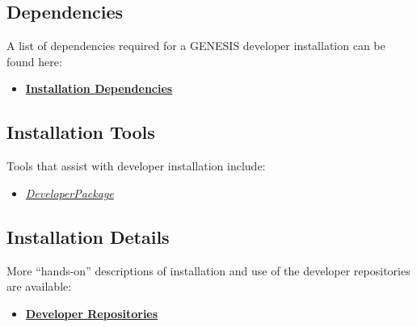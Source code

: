 \documentclass[12pt]{article}
\begin{document}
\subsection*{Dependencies}
A list of dependencies required for a GENESIS developer installation can be found here:
\begin{itemize}
   \item[]\href{../genesis-dependencies/genesis-dependencies.tex}{\bf Installation Dependencies}
\end{itemize}

\subsection*{Installation Tools}
Tools that assist with developer installation include:
\begin{itemize}
   \item[]\href{../developer-package/developer-package.tex}{\it DeveloperPackage}
\end{itemize}

\subsection*{Installation Details}
More ``hands-on'' descriptions of installation and use of the developer repositories are available:
\begin{itemize}
   \item[]\href{../developer-repository/developer-repository.tex}{\bf Developer Repositories}
\end{itemize}
\end{document}
